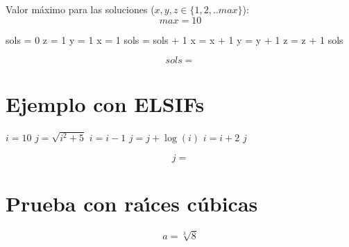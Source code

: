 \documentclass{article}
\begin{document}
Valor m\'aximo para las soluciones ($x, y, z \in \{1,2,..max\}$):
\begin{equation}
max = 10
\label{eq:calc:max}
\end{equation}



\begin{algorithm}
\caption{N\'umero de soluciones}
\label{alg:calc:numsols}
\begin{algorithmic}
    \STATE sols = 0
    \STATE z = 1
        \STATE y = 1
            \STATE x = 1
                    \STATE sols = sols + 1
                \ENDIF
                \STATE x = x + 1
            \ENDWHILE
            \STATE y = y + 1
        \ENDWHILE
        \STATE z = z + 1
    \ENDWHILE
    \RETURN sols
\end{algorithmic}
\end{algorithm}

\begin{equation}
    sols = 
    \label{eq:res:sols}
\end{equation}


\section{Ejemplo con ELSIFs}

\begin{algorithm}
\caption{Ejemplo de un algoritmo con ELSIFs anidados}
\label{alg:calc:Ejemplo con ELSIF}
\begin{algorithmic}
        \STATE $i = 10$
        \STATE $j = \sqrt{i^2 + 5}$
            \STATE $i = i - 1$
                \STATE $j = j + \log(i)$
            \ENDWHILE
            \STATE $i = i + 2$
        \ENDIF
        \RETURN $j$
\end{algorithmic}
\end{algorithm}



\begin{equation}
    j = 
    \label{eq:res:j}
\end{equation}

\section{Prueba con ra\'{\i}ces c\'ubicas}
\begin{equation}
    a = \sqrt[3]{8}
    \label{eq:calc:a}
\end{equation}
\end{document}
